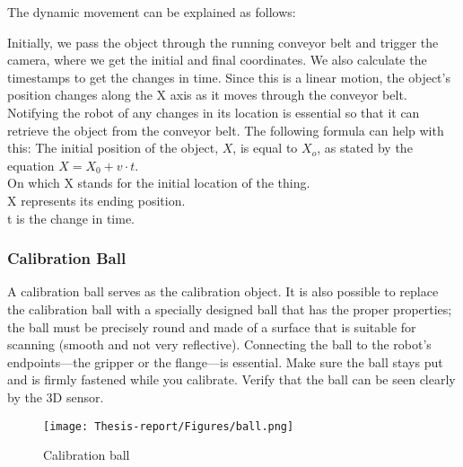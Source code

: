 \documentclass[12pt]{article}
\begin{document}
The dynamic movement can be explained as follows:

Initially, we pass the object through the running conveyor belt and trigger the camera, where we get the initial and final coordinates. We also calculate the timestamps to get the changes in time. Since this is a linear motion, the object's position changes along the X axis as it moves through the conveyor belt. Notifying the robot of any changes in its location is essential so that it can retrieve the object from the conveyor belt. The following formula can help with this:  The initial position of the object, $X$, is equal to $X_o$, as stated by the equation $X = X_0 + v\cdot t$.\\
On which X stands for the initial location of the thing.\\
X represents its ending position.\\
t is the change in time. 


\subsubsection{Calibration Ball}
A calibration ball serves as the calibration object. It is also possible to replace the calibration ball with a specially designed ball that has the proper properties; the ball must be precisely round and made of a surface that is suitable for scanning (smooth and not very reflective). Connecting the ball to the robot's endpoints—the gripper or the flange—is essential.  Make sure the ball stays put and is firmly fastened while you calibrate. Verify that the ball can be seen clearly by the 3D sensor\cite{ref2}. \\
\begin{figure}[h]
    \centering
    \texttt{[image: Thesis-report/Figures/ball.png]}
    \caption{Calibration ball \cite{ref2}}
    \label{fig:Photoneo Cmaera}
\end{figure} 
\end{document}
